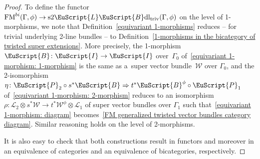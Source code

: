 \documentclass[pdftex]{sigma}
\numberwithin{equation}{section}
\def\mathscr#1{\EuScript{#1}}
\newcommand{\LineBdl}{\mathscr{L}\mathscr{B}\mathrm{dl}}
\newcommand{\stwoLineBdltriv}{\mathrm{s}2\LineBdl_{\mathrm{triv}}}
\begin{document}
\begin{proof}
 To define the functor $\mathrm{FM}^{bi}(\Gamma,\phi)\to \stwoLineBdltriv(\Gamma,\phi)$ on the level of 1-morphisms, we note that Definition~\ref{equivariant 1-morphisms}
 reduces -- for trivial underlying 2-line bundles -- to Definition~\ref{1-morphisms in the bicategory of twisted super extensions}. More precisely,
 the 1-morphism $\mathscr{B} \colon \mathscr{I} \to \mathscr{I}$ over~$\Gamma_0$ of~\eqref{equivariant 1-morphism: 1-morphism} is the same as a~super vector bundle~$\mathcal{W}$ over $\Gamma_0$, and the 2-isomorphism $\eta \colon \mathscr{P}_2 \circ s^*\mathscr{B} \Rightarrow t^*\mathscr{B}^\phi \circ \mathscr{P}_1$
 of~\eqref{equivariant 1-morphism: 2-morphism} reduces to an isomorphism~${\rho\colon \mathcal{L}_2 \otimes s^*\mathcal{W} \to t^*\mathcal{W}^\phi \otimes \mathcal{L}_1}$
 of super vector bundles over $\Gamma_1$ such that~\eqref{equivariant 1-morphism: diagram} becomes~\eqref{FM generalized twisted vector bundles category diagram}.
 Similar reasoning holds on the level of 2-morphisms.

 It is also easy to check that both constructions result in functors and moreover in an equivalence of categories and an equivalence of bicategories, respectively.
\end{proof}
\end{document}
